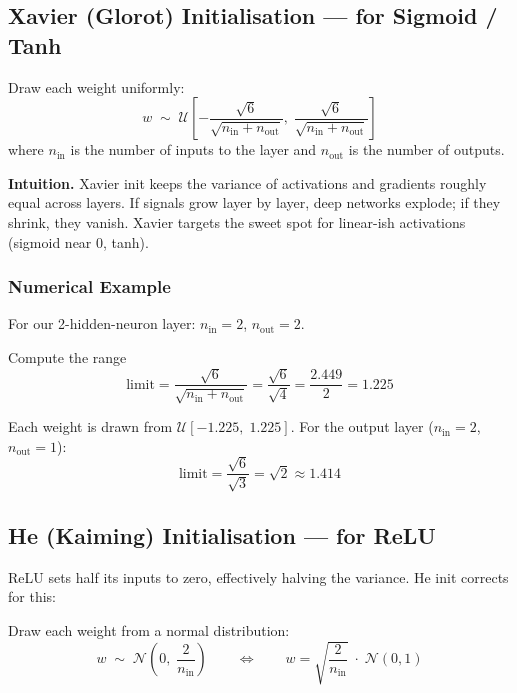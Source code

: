 \documentclass[12pt, a4paper]{article}
\newif\ifstudentmode
\newcommand{\sol}[2][6cm]{%
  \ifstudentmode\underline{\hspace{#1}}\else{#2}\fi}
\theoremstyle{definition}
\begin{document}
\subsection{Xavier (Glorot) Initialisation --- for Sigmoid / Tanh}

\begin{resultbox}
Draw each weight uniformly:
\[
  w \;\sim\; \mathcal{U}\!\left[-\frac{\sqrt{6}}{\sqrt{n_{\text{in}}+n_{\text{out}}}},\;
                                  \frac{\sqrt{6}}{\sqrt{n_{\text{in}}+n_{\text{out}}}}\right]
\]
where $n_{\text{in}}$ is the number of inputs to the layer and
$n_{\text{out}}$ is the number of outputs.
\end{resultbox}

\textbf{Intuition.}
Xavier init keeps the variance of activations and gradients roughly equal
across layers.  If signals grow layer by layer, deep networks explode;
if they shrink, they vanish.  Xavier targets the sweet spot for
linear-ish activations (sigmoid near $0$, tanh).

\subsubsection*{Numerical Example}

For our 2-hidden-neuron layer: $n_{\text{in}} = 2$, $n_{\text{out}} = 2$.

\begin{stepbox}{Compute the range}
\[
  \text{limit} = \frac{\sqrt{6}}{\sqrt{n_{\text{in}}+n_{\text{out}}}}
               = \frac{\sqrt{6}}{\sqrt{4}}
               = \frac{2.449}{2}
               = \sol[3cm]{1.225}
\]
\end{stepbox}

Each weight is drawn from $\mathcal{U}[-1.225,\; 1.225]$.
For the output layer ($n_{\text{in}}=2$, $n_{\text{out}}=1$):
\[
  \text{limit} = \frac{\sqrt{6}}{\sqrt{3}} = \sqrt{2} \approx \sol[3cm]{1.414}
\]

\subsection{He (Kaiming) Initialisation --- for ReLU}

ReLU sets half its inputs to zero, effectively halving the variance.
He init corrects for this:

\begin{resultbox}
Draw each weight from a normal distribution:
\[
  w \;\sim\; \mathcal{N}\!\left(0,\;\frac{2}{n_{\text{in}}}\right)
  \qquad\Longleftrightarrow\qquad
  w = \sqrt{\frac{2}{n_{\text{in}}}}\;\cdot\;\mathcal{N}(0,1)
\]
\end{resultbox}
\end{document}
